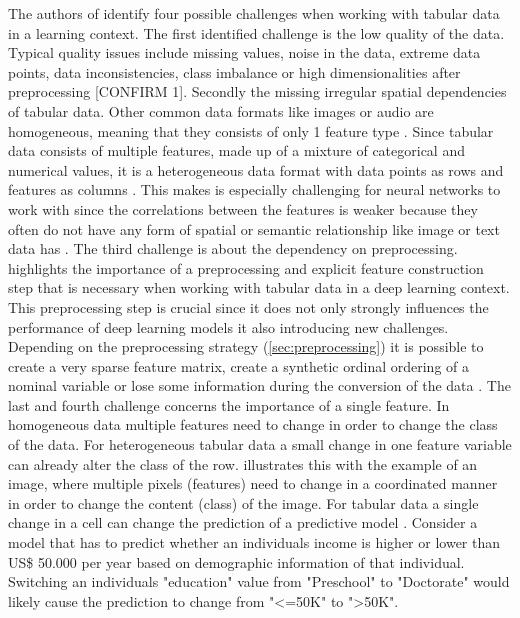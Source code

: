 The authors of \cite{borisov2022DeepNeuralNetworks} identify four possible challenges when working with tabular data in a learning context.
The first identified challenge is the low quality of the data. Typical quality issues include missing values, noise in the data, extreme data points, data inconsistencies, class imbalance or high dimensionalities after preprocessing \cite{borisov2022DeepNeuralNetworks}[CONFIRM 1].
Secondly the missing irregular spatial dependencies of tabular data. Other common data formats like images or audio are homogeneous, 
meaning that they consists of only 1 feature type \cite{borisov2022DeepNeuralNetworks}.
Since tabular data consists of multiple features, made up of a mixture of categorical and numerical values, it is a heterogeneous data format with data points as rows and features as columns \cite{borisov2022DeepNeuralNetworks}.
This makes is especially challenging for neural networks to work with since the correlations between the features is weaker because they often do not have any form of spatial or semantic relationship like image or text data has \cite{borisov2022DeepNeuralNetworks, yoon2020VIMEExtendingSuccess}.
The third challenge is about the dependency on preprocessing. \cite{borisov2022DeepNeuralNetworks} highlights the importance of a preprocessing and explicit feature construction step that is necessary when working with tabular data in a deep learning context.
This preprocessing step is crucial since it does not only strongly influences the performance of deep learning \glspl{model} \cite{gorishniy2022EmbeddingsNumericalFeatures} 
it also introducing new challenges. 
Depending on the preprocessing strategy (\autoref{sec:preprocessing}) it is possible to create a very sparse feature matrix, create a synthetic ordinal ordering of a nominal variable or lose some information during the conversion of the data \cite{borisov2022DeepNeuralNetworks}.
The last and fourth challenge concerns the importance of a single feature. In homogeneous data multiple features need to change in order to change the class of the data. 
For heterogeneous tabular data a small change in one feature variable can already alter the class of the row. 
\cite{borisov2022DeepNeuralNetworks} illustrates this with the example of an image, where multiple pixels (\ie features) need to change in a coordinated manner in order to change the content (\ie class) of the image.
For tabular data a single change in a cell can change the prediction of a predictive \gls{model} \cite{borisov2022DeepNeuralNetworks}. 
Consider a \gls{model} that has to predict whether an individuals income is higher or lower than US\$ 50.000 per year \cite{Dua:2019} based on demographic information of that individual.
Switching an individuals "education" value from "Preschool" to "Doctorate" would likely cause the prediction to change from "<=50K" to ">50K".



